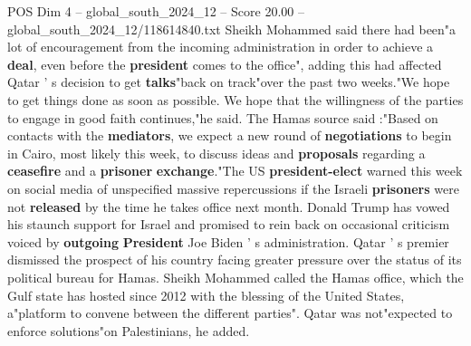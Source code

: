 \begin{textsample}{POS Dim 4 – global\_south\_2024\_12 – Score 20.00 – global\_south\_2024\_12/118614840.txt}
Sheikh Mohammed said there had been"a lot of encouragement from the incoming administration in order to achieve a \textbf{deal}, even before the \textbf{president} comes to the office", adding this had affected Qatar ' s decision to get \textbf{talks}"back on track"over the past two weeks."We hope to get things done as soon as possible.
We hope that the willingness of the parties to engage in good faith continues,"he said.
The Hamas source said :"Based on contacts with the \textbf{mediators}, we expect a new round of \textbf{negotiations} to begin in Cairo, most likely this week, to discuss ideas and \textbf{proposals} regarding a \textbf{ceasefire} and a \textbf{prisoner} \textbf{exchange}."The US \textbf{president-elect} warned this week on social media of unspecified massive repercussions if the Israeli \textbf{prisoners} were not \textbf{released} by the time he takes office next month.
Donald Trump has vowed his staunch support for Israel and promised to rein back on occasional criticism voiced by \textbf{outgoing} \textbf{President} Joe Biden ' s administration.
Qatar ' s premier dismissed the prospect of his country facing greater pressure over the status of its political bureau for Hamas.
Sheikh Mohammed called the Hamas office, which the Gulf state has hosted since 2012 with the blessing of the United States, a"platform to convene between the different parties".
Qatar was not"expected to enforce solutions"on Palestinians, he added.

\end{textsample}
